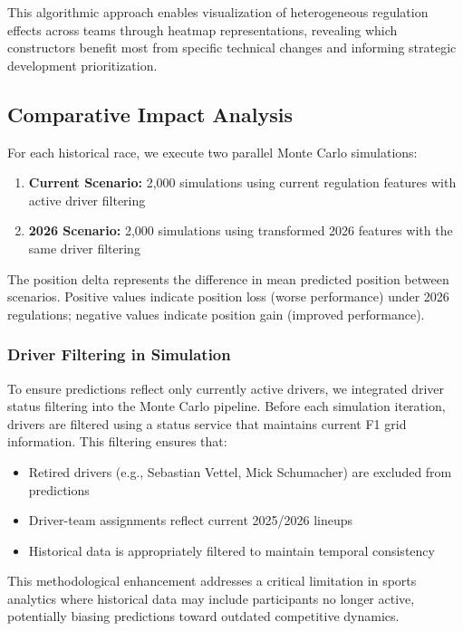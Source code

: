 \documentclass[conference]{IEEEtran}
\begin{document}
This algorithmic approach enables visualization of heterogeneous regulation effects across teams through heatmap representations, revealing which constructors benefit most from specific technical changes and informing strategic development prioritization.

\subsection{Comparative Impact Analysis}

For each historical race, we execute two parallel Monte Carlo simulations:

\begin{enumerate}
    \item \textbf{Current Scenario:} 2,000 simulations using current regulation features with active driver filtering
    \item \textbf{2026 Scenario:} 2,000 simulations using transformed 2026 features with the same driver filtering
\end{enumerate}

The position delta represents the difference in mean predicted position between scenarios. Positive values indicate position loss (worse performance) under 2026 regulations; negative values indicate position gain (improved performance).

\subsubsection{Driver Filtering in Simulation}

To ensure predictions reflect only currently active drivers, we integrated driver status filtering into the Monte Carlo pipeline. Before each simulation iteration, drivers are filtered using a status service that maintains current F1 grid information. This filtering ensures that:
\begin{itemize}
    \item Retired drivers (e.g., Sebastian Vettel, Mick Schumacher) are excluded from predictions
    \item Driver-team assignments reflect current 2025/2026 lineups
    \item Historical data is appropriately filtered to maintain temporal consistency
\end{itemize}

This methodological enhancement addresses a critical limitation in sports analytics where historical data may include participants no longer active, potentially biasing predictions toward outdated competitive dynamics.
\end{document}
